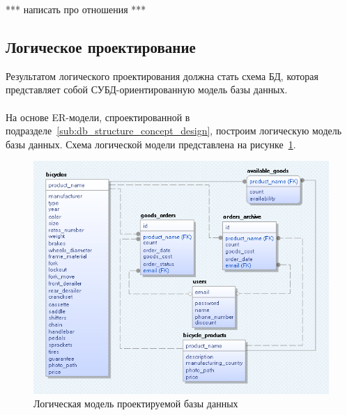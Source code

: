 
*** написать про отношения ***

\pagebreak

\subsection{Логическое проектирование}
\label{sub:db_structure_logical_design}

Результатом логического проектирования должна стать схема БД,
которая представляет собой СУБД-ориентированную модель базы данных.

\paragraph{}
На основе ER-модели, спроектированной в подразделе~\ref{sub:db_structure_concept_design},
построим логическую модель базы данных. Схема логической модели
представлена на рисунке~\ref{fig:logical_model}.
\begin{figure}[h]
  \centering
  \includegraphics[width=150mm]{pic/logical_model.png}
  \caption{Логическая модель проектируемой базы данных}
  \label{fig:logical_model}
\end{figure}

\pagebreak

